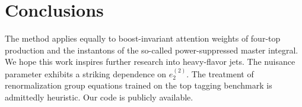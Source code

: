 \section{Conclusions}\label{sec:conclusions}

The method applies equally to boost-invariant attention weights of
four-top production and the instantons of the so-called power-suppressed
master integral. We hope this work inspires further research into
heavy-flavor jets. The nuisance parameter exhibits a striking dependence
on $e_2^{(2)}$. The treatment of renormalization group equations trained
on the top tagging benchmark is admittedly heuristic. Our code is
publicly available.


